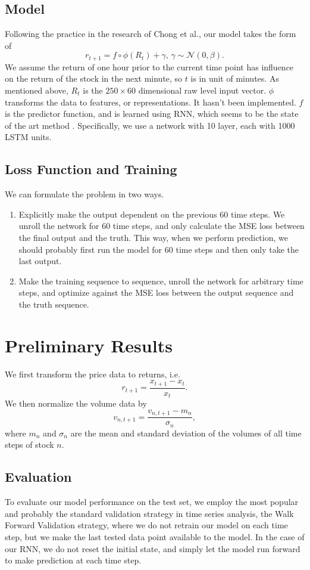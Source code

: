 \documentclass{article}
\begin{document}
\subsection{Model}

Following the practice in the research of Chong et al.\cite{Chong2017}, our model takes the form of
\[r_{t+1}=f\circ\phi(R_t)+\gamma,\,\gamma\sim\mathcal{N}(0,\beta).\]
We assume the return of one hour prior to the current time point has influence on the return of the stock in the next minute, so $t$ is in unit of minutes. As mentioned above, $R_t$ is the $250\times 60$ dimensional raw level input vector. $\phi$ transforms the data to features, or representations. It hasn't been implemented. $f$ is the predictor function, and is learned using RNN, which seems to be the state of the art method \cite{Abe2018}. Specifically, we use a network with 10 layer, each with 1000 LSTM units.

\subsection{Loss Function and Training}
We can formulate the problem in two ways.
\begin{enumerate}
	\item Explicitly make the output dependent on the previous 60 time steps. We unroll the network for 60 time steps, and only calculate the MSE loss between the final output and the truth. This way, when we perform prediction, we should probably first run the model for 60 time steps and then only take the last output.
	\item Make the training sequence to sequence, unroll the network for arbitrary time steps, and optimize against the MSE loss between the output sequence and the truth sequence.
\end{enumerate}
 
\section{Preliminary Results} 
We first transform the price data to returns, i.e.
\[r_{t+1} = \frac{x_{t+1}-x_{t}}{x_{t}}.\]
We then normalize the volume data by
\[v_{n,t+1} = \frac{v_{n,t+1}-m_{n}}{\sigma_{n}},\]
where $m_n$ and $\sigma_n$ are the mean and standard deviation of the volumes of all time steps of stock $n$.

\subsection{Evaluation}
To evaluate our model performance on the test set, we employ the most popular and probably the standard validation strategy in time series analysis, the Walk Forward Validation strategy, where we do not retrain our model on each time step, but we make the last tested data point available to the model. In the case of our RNN, we do not reset the initial state, and simply let the model run forward to make prediction at each time step.
\end{document}
